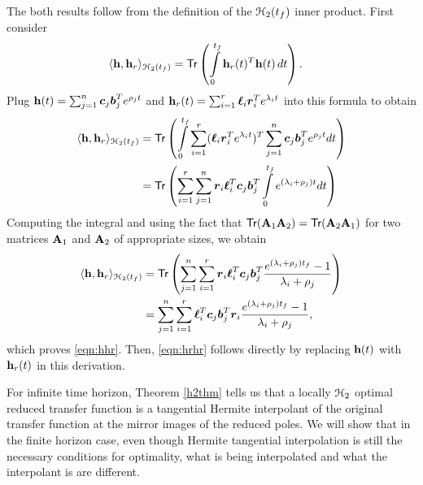 \documentclass[twocolumn]{autart}
\begin{document}
\begin{pf}
The both results  follow from the definition of the $\EuScript{H}_2(t_f)$ inner product.  First consider
\begin{align*}
\langle\h, \h_r\rangle_{\ch_2({\tf})}&=\mathsf{Tr}\left(\int_0^{\tf}\h_r(t)^T\h(t)\, dt\right).
\end{align*}
Plug $\mathbf{h} (t)= \sum_{j=1}^n \boldsymbol{c}_j \boldsymbol{b}_j^T e^{\rho_jt}$ and $\mathbf{h}_r(t) = \sum_{i=1}^r \boldsymbol{\ell}_i  \boldsymbol{r}_i^T e^{\lambda_it}$
into this formula to obtain
\begin{align*}
\langle\h, \h_r\rangle_{\ch_2({\tf})}&=\mathsf{Tr} \left(\int_0^{\tf}\sum_{i=1}^r(\lc_{i}\rc_{i}^Te^{\lambda_it})^T\sum_{j=1}^n\cc_j\bb_j^Te^{\rho_jt}dt\right)\\
 &= \mathsf{Tr} \left(\sum_{i=1}^r 
\sum_{j=1}^n 
\rc_{i}\lc_{i}^T\cc_j \bb_j^T \int_0^{\tf}e^{(\lambda_i + \rho_j )t} dt\right)
\end{align*}
Computing the integral and using the fact that $\mathsf{Tr}(\mathbf{A}_1 \mathbf{A}_2) = \mathsf{Tr}(\mathbf{A}_2 \mathbf{A}_1)$  for two matrices $\mathbf{A}_1$ and $\mathbf{A}_2$ of  appropriate sizes,   we obtain
\begin{align*}
\langle\mathbf{h}, \mathbf{h}_r\rangle_{\EuScript{H}_2({t_f})}&=\mathsf{Tr}\left(\sum_{j=1}^n\sum_{i=1}^r\boldsymbol{r}_{i}\boldsymbol{\ell}_{i}^T\boldsymbol{c}_j\boldsymbol{b}_j^T\dfrac{e^{(\lambda_i+\rho_j){t_f}}-1}{\lambda_i+\rho_j}\right)\\
&=\sum_{j=1}^n\sum_{i=1}^r\boldsymbol{\ell}_{i}^T\boldsymbol{c}_j\boldsymbol{b}_j^T\boldsymbol{r}_{i}\dfrac{e^{(\lambda_i+\rho_j){t_f}}-1}{\lambda_i+\rho_j},
\end{align*}
which proves \eqref{eqn:hhr}. Then, \eqref{eqn:hrhr} follows directly by replacing $\mathbf{h}(t)$ with $\mathbf{h}_r(t)$ in this derivation. 
\end{pf}
For infinite time horizon, Theorem \ref{h2thm} tells us that a locally $\EuScript{H}_2$ optimal reduced transfer function is a tangential Hermite interpolant of the original transfer function at the mirror images of the reduced poles. We will show that in the finite horizon case, even though Hermite tangential interpolation is still the necessary conditions for optimality,  what is being interpolated and what the interpolant is are different.
\end{document}
